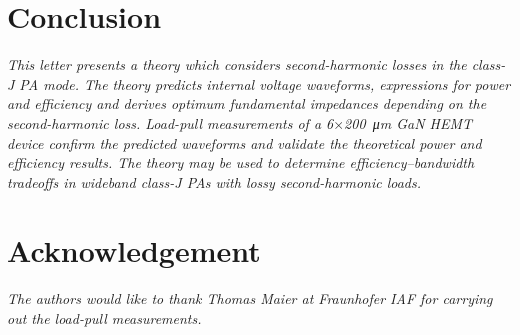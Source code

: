 \documentclass[journal]{IEEEtran}
\begin{document}
\section{Conclusion}
\label{sec:conclusion}
{\itshape
This letter presents a theory which considers second-harmonic losses in the
class-J PA mode. The theory predicts internal voltage waveforms, expressions
for power and efficiency and derives optimum fundamental impedances depending
on the second-harmonic loss. Load-pull measurements of a
6$\times$\SI{200}{\micro\meter} GaN HEMT device confirm the predicted waveforms
and validate the theoretical power and efficiency results. The theory may be
used to determine efficiency--bandwidth tradeoffs in wideband class-J PAs with
lossy second-harmonic loads.

}

\section*{Acknowledgement}
{\itshape
The authors would like to thank Thomas Maier at Fraunhofer IAF for carrying out
the load-pull measurements.
}




\nocite{*}
\end{document}
